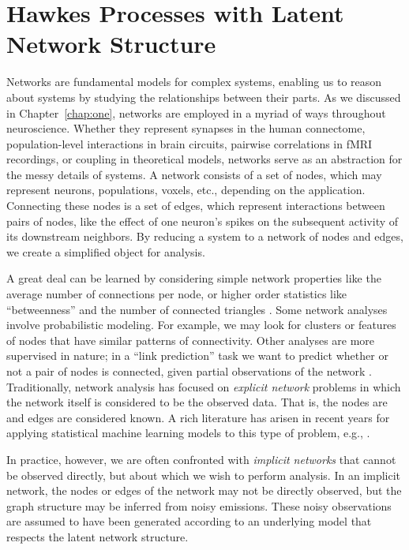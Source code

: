 
\chapter{Hawkes Processes with Latent Network Structure}
\label{chap:three}

Networks are fundamental models for complex systems, enabling us to
reason about systems by studying the relationships between their
parts.  As we discussed in Chapter~\ref{chap:one}, networks are
employed in a myriad of ways throughout neuroscience.  Whether they
represent synapses in the human connectome, population-level
interactions in brain circuits, pairwise correlations in fMRI
recordings, or coupling in theoretical models, networks serve as an
abstraction for the messy details of systems.  A network consists of a
set of nodes, which may represent neurons, populations, voxels, etc.,
depending on the application.  Connecting these nodes is a set of
edges, which represent interactions between pairs of nodes, like the
effect of one neuron's spikes on the subsequent activity of its
downstream neighbors.  By reducing a system to a network of nodes and
edges, we create a simplified object for analysis.

A great deal can be learned by considering simple network properties
like the average number of connections per node, or higher order
statistics like ``betweenness'' and the number of connected triangles
\citep{bullmore2009complex}.  Some network analyses involve
probabilistic modeling.  For example, we may look for clusters or
features of nodes that have similar patterns of connectivity.  Other
analyses are more supervised in nature; in a ``link prediction'' task
we want to predict whether or not a pair of nodes is connected, given
partial observations of the network \citep{Liben-2007}.
Traditionally, network analysis has focused on \emph{explicit network}
problems in which the network itself is considered to be the observed
data.  That is, the nodes are and edges are considered known. A rich
literature has arisen in recent years for applying statistical machine
learning models to this type of problem, e.g.,
\citet{Liben-2007,Hoff-2008,Goldenberg-2010}.

In practice, however, we are often confronted with \emph{implicit
  networks} that cannot be observed directly, but about which we wish
to perform analysis.  In an implicit network, the nodes or edges of
the network may not be directly observed, but the graph structure may
be inferred from noisy emissions.  These noisy observations are
assumed to have been generated according to an underlying model that
respects the latent network structure.

